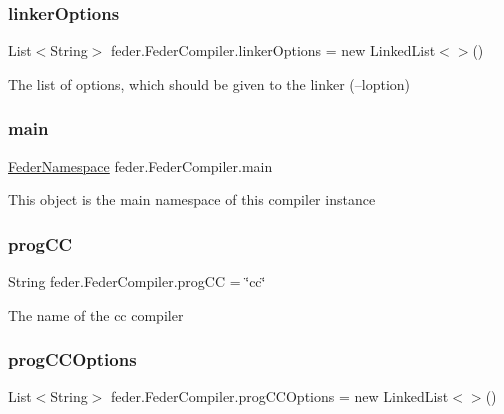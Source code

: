 \subsubsection{\texorpdfstring{linker\+Options}{linkerOptions}}
{\footnotesize\ttfamily List$<$String$>$ feder.\+Feder\+Compiler.\+linker\+Options = new Linked\+List$<$$>$()}

The list of options, which should be given to the linker (--loption) \mbox{\label{classfeder_1_1FederCompiler_ae1ddfe80b0facbe91b5d0d9ab62882a5}} 
\subsubsection{\texorpdfstring{main}{main}}
{\footnotesize\ttfamily \hyperlink{classfeder_1_1types_1_1FederNamespace}{Feder\+Namespace} feder.\+Feder\+Compiler.\+main}

This object is the main namespace of this compiler instance \mbox{\label{classfeder_1_1FederCompiler_a00a0ae826fb482e7c2c1ecbfde051218}} 
\subsubsection{\texorpdfstring{prog\+CC}{progCC}}
{\footnotesize\ttfamily String feder.\+Feder\+Compiler.\+prog\+CC = \char`\"{}cc\char`\"{}}

The name of the cc compiler \mbox{\label{classfeder_1_1FederCompiler_a59d4d26003b722044c7d36a09c2c36e8}} 
\subsubsection{\texorpdfstring{prog\+C\+C\+Options}{progCCOptions}}
{\footnotesize\ttfamily List$<$String$>$ feder.\+Feder\+Compiler.\+prog\+C\+C\+Options = new Linked\+List$<$$>$()}


